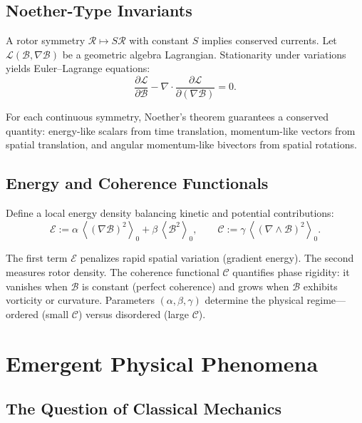 \documentclass[11pt,a4paper]{article}
\newcommand{\grade}[2]{\left\langle #1 \right\rangle_{#2}}
\newcommand{\scal}[1]{\grade{#1}{0}}
\newcommand{\Rotor}{\mathcal{R}}
\newcommand{\Biv}{\mathcal{B}}
\newcommand{\D}{\nabla}                        %
\theoremstyle{definition}
\theoremstyle{plain}
\theoremstyle{remark}
\begin{document}
\subsection{Noether-Type Invariants}

A rotor symmetry $\Rotor\mapsto S\Rotor$ with constant $S$ implies conserved currents. Let $\mathcal{L}(\Biv,\D\Biv)$ be a geometric algebra Lagrangian. Stationarity under variations yields Euler--Lagrange equations:
\begin{equation}
\frac{\partial \mathcal{L}}{\partial \Biv} - \D \cdot \frac{\partial \mathcal{L}}{\partial (\D\Biv)} = 0.
\end{equation}

For each continuous symmetry, Noether's theorem guarantees a conserved quantity: energy-like scalars from time translation, momentum-like vectors from spatial translation, and angular momentum-like bivectors from spatial rotations.

\subsection{Energy and Coherence Functionals}

Define a local energy density balancing kinetic and potential contributions:
\begin{equation}
  \mathcal{E} := \alpha\, \scal{(\D \Biv)^2} + \beta\, \scal{\Biv^2},
  \qquad
  \mathcal{C} := \gamma\, \scal{(\D\wedge\Biv)^2}.
\end{equation}

The first term $\mathcal{E}$ penalizes rapid spatial variation (gradient energy). The second measures rotor density. The coherence functional $\mathcal{C}$ quantifies phase rigidity: it vanishes when $\Biv$ is constant (perfect coherence) and grows when $\Biv$ exhibits vorticity or curvature. Parameters $(\alpha,\beta,\gamma)$ determine the physical regime---ordered (small $\mathcal{C}$) versus disordered (large $\mathcal{C}$).

\vspace{1em}

\section{Emergent Physical Phenomena}\label{sec:emergent}

\subsection{The Question of Classical Mechanics}
\end{document}
